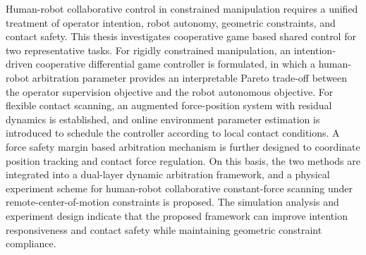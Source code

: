 
\begin{abstract}
约束操作场景下的人机协同控制需要同时处理操作者意图、机器人自主目标、几何约束和环境接触安全之间的耦合关系。针对刚性几何约束任务中控制权分配不清、柔性接触任务中位置精度与接触力安全难以兼顾等问题，本文围绕合作博弈共享控制展开研究。首先，建立机器人运动学、动力学、约束运动、接触建模和稳定性分析等理论基础；其次，面向刚性约束操作任务，构造意图驱动的合作微分博弈共享控制方法，通过人机仲裁参数在操作者监督目标和机器人自主目标之间形成可解释的帕累托权衡；再次，面向柔性接触扫描任务，建立含残差项的力--位增广系统，引入环境参数在线估计与力安全裕度仲裁机制，实现位置跟踪和接触力调节的协同优化；最后，将上述两类方法融合为双层动态仲裁框架，并设计远心运动约束下的人机协同恒力扫描实物实验方案。仿真与实验设计表明，所提方法能够在保持几何约束合规性的同时提升操作者意图响应能力和接触安全性，为约束接触操作中的人机协同控制提供了系统化思路。

\end{abstract}

\begin{abstract*}
Human-robot collaborative control in constrained manipulation requires a unified treatment of operator intention, robot autonomy, geometric constraints, and contact safety. This thesis investigates cooperative game based shared control for two representative tasks. For rigidly constrained manipulation, an intention-driven cooperative differential game controller is formulated, in which a human-robot arbitration parameter provides an interpretable Pareto trade-off between the operator supervision objective and the robot autonomous objective. For flexible contact scanning, an augmented force-position system with residual dynamics is established, and online environment parameter estimation is introduced to schedule the controller according to local contact conditions. A force safety margin based arbitration mechanism is further designed to coordinate position tracking and contact force regulation. On this basis, the two methods are integrated into a dual-layer dynamic arbitration framework, and a physical experiment scheme for human-robot collaborative constant-force scanning under remote-center-of-motion constraints is proposed. The simulation analysis and experiment design indicate that the proposed framework can improve intention responsiveness and contact safety while maintaining geometric constraint compliance.
\end{abstract*}
